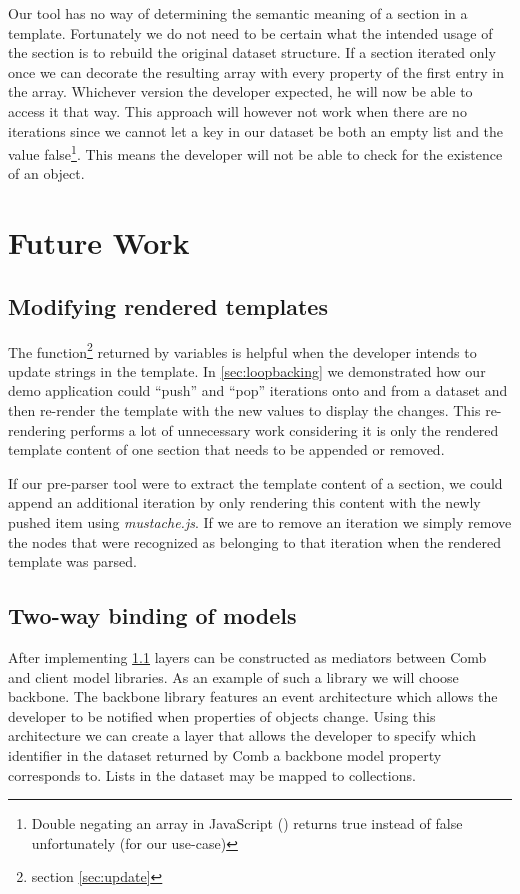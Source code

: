 \documentclass[thesis.tex]{subfiles}
\begin{document}
Our tool has no way of determining the semantic meaning of a section in a
template.
Fortunately we do not need to be certain what the intended usage of the section
is to rebuild the original dataset structure.
If a section iterated only once we can decorate the resulting array with every
property of the first entry in the array. Whichever version the developer
expected, he will now be able to access it that way. This approach will however
not work when there are no iterations since we cannot let a key in our dataset
be both an empty list and the value false\footnote{
	Double negating an array in JavaScript (\inline{\!\![]}) returns true instead
	of false unfortunately (for our use-case)
}. This means the developer will not be able to check for the existence of an
object.




\section{Future Work}

\subsection{Modifying rendered templates}
\label{sec:update-dom}
The  function\footnote{section \ref{sec:update}} returned by
variables is helpful when the developer intends to update strings in the
template. In \ref{sec:loopbacking} we demonstrated how our demo application
could ``push'' and ``pop'' iterations onto and from a dataset and then re-render
the template with the new values to display the changes.
This re-rendering performs a lot of unnecessary work considering it is only
the rendered template content of one section that needs to be appended or
removed.

If our pre-parser tool were to extract the template content of a section, we
could append an additional iteration by only rendering this content with the
newly pushed item using \emph{mustache.js}.
If we are to remove an iteration we simply remove the nodes that were recognized
as belonging to that iteration when the rendered template was parsed.

\subsection{Two-way binding of models}
\label{sec:two-way-binding}
After implementing \ref{sec:update-dom} layers can be constructed as
mediators between Comb and client model libraries. As an example of such a
library we will choose backbone. The backbone library features an event
architecture which allows the developer to be notified when properties of
objects change. Using this architecture we can create a layer that allows the
developer to specify which identifier in the dataset returned by Comb a
backbone model property corresponds to. Lists in the dataset may be mapped to
collections.
\end{document}

